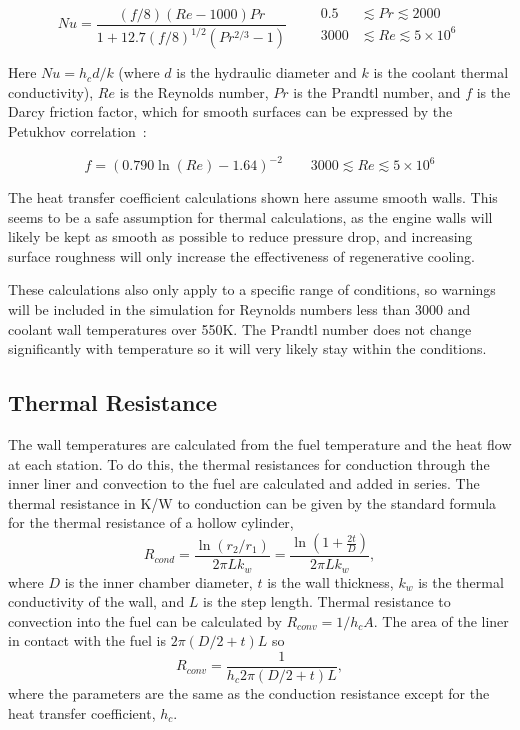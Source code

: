 \documentclass[11pt]{article}
\begin{document}
\begin{equation}
  Nu = \frac{(f/8)(Re - 1000)Pr}{1 + 12.7(f/8)^{1/2}(Pr^{2/3} - 1)}
  \qquad
  \begin{aligned}
    0.5 & \lesssim Pr \lesssim 2000 \\
    3000 & \lesssim Re \lesssim 5 \times 10^6
  \end{aligned}
\end{equation}

Here $Nu = h_c d / k$ (where $d$ is the hydraulic diameter and $k$ is the coolant thermal conductivity), $Re$ is the Reynolds number, $Pr$ is the Prandtl number, and $f$ is the Darcy friction factor, which for smooth surfaces can be expressed by the Petukhov correlation~\cite{bergman_fundamentals_2017}:

\begin{equation}
  f = (0.790 \ln (Re) - 1.64)^{-2} \qquad 3000 \lesssim Re \lesssim 5 \times 10^6
\end{equation}

The heat transfer coefficient calculations shown here assume smooth walls. This seems to be a safe assumption for thermal calculations, as the engine walls will likely be kept as smooth as possible to reduce pressure drop, and increasing surface roughness will only increase the effectiveness of regenerative cooling.

These calculations also only apply to a specific range of conditions, so warnings will be included in the simulation for Reynolds numbers less than 3000 and coolant wall temperatures over 550K. The Prandtl number does not change significantly with temperature so it will very likely stay within the conditions.

\subsection{Thermal Resistance}
The wall temperatures are calculated from the fuel temperature and the heat flow at each station. To do this, the thermal resistances for conduction through the inner liner and convection to the fuel are calculated and added in series. The thermal resistance in K/W to conduction can be given by the standard formula for the thermal resistance of a hollow cylinder,
\begin{equation}
    R_{cond} = \frac{\ln{\left(r_2 / r_1\right)}}{2 \pi L k_w} = \frac{\ln{\left( 1 + \frac{2t}{D}\right)}}{2 \pi L k_w},
\end{equation}
where $D$ is the inner chamber diameter, $t$ is the wall thickness, $k_w$ is the thermal conductivity of the wall, and $L$ is the step length. Thermal resistance to convection into the fuel can be calculated by $R_{conv} = 1 / h_c A$. The area of the liner in contact with the fuel is $2 \pi (D / 2 + t) L $ so
\begin{equation}
    R_{conv} = \frac{1}{h_c 2 \pi (D/2 + t) L},
\end{equation}
where the parameters are the same as the conduction resistance except for the heat transfer coefficient, $h_c$.
\end{document}
